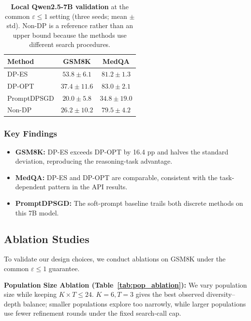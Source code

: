 \begin{table}[t]
\centering
\small
\setlength{\tabcolsep}{3pt}
\begin{tabular}{@{}lcc@{}}
\toprule
\textbf{Method} & \textbf{GSM8K} & \textbf{MedQA} \\
\midrule
DP-ES & $53.8\pm6.1$ & $81.2\pm1.3$ \\
DP-OPT & $37.4\pm11.6$ & $83.0\pm2.1$ \\
PromptDPSGD & $20.0\pm5.8$ & $34.8\pm19.0$ \\
Non-DP & $26.2\pm10.2$ & $79.5\pm4.2$ \\
\bottomrule
\end{tabular}
\caption{\textbf{Local Qwen2.5-7B validation} at the common $\varepsilon\leq1$ setting (three seeds; mean $\pm$ std). Non-DP is a reference rather than an upper bound because the methods use different search procedures.}
\label{tab:local_validation}
\end{table}


\subsubsection{Key Findings}

\begin{itemize}
    \item \textbf{GSM8K:} DP-ES exceeds DP-OPT by 16.4 pp and halves the standard deviation, reproducing the reasoning-task advantage.
    \item \textbf{MedQA:} DP-ES and DP-OPT are comparable, consistent with the task-dependent pattern in the API results.
    \item \textbf{PromptDPSGD:} The soft-prompt baseline trails both discrete methods on this 7B model.
\end{itemize}

\subsection{Ablation Studies}

\noindent To validate our design choices, we conduct ablations on GSM8K under the common $\varepsilon\leq1$ guarantee.

\noindent \textbf{Population Size Ablation (Table~\ref{tab:pop_ablation}):} We vary population size while keeping $K\times T\leq24$. $K=6,T=3$ gives the best observed diversity--depth balance; smaller populations explore too narrowly, while larger populations use fewer refinement rounds under the fixed search-call cap.

